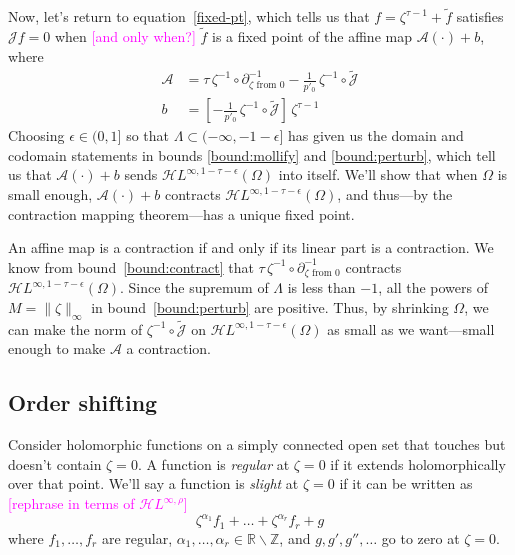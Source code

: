 \documentclass{article}
\theoremstyle{plain}
\newcommand{\Z}{\mathbb{Z}}
\newcommand{\R}{\mathbb{R}}
\newcommand{\holoL}[1]{\mathcal{H}L^{#1}} %
\begin{document}
Now, let's return to equation~\ref{fixed-pt}, which tells us that $f = \zeta^{\tau-1} + \tilde{f}$ satisfies $\mathcal{J}f = 0$ when \textcolor{magenta}{[and only when?]} $\tilde{f}$ is a fixed point of the affine map $\mathcal{A}(\cdot) + b$, where
\begin{align*}
\mathcal{A} & = \tau\,\zeta^{-1} \circ \partial^{-1}_{\zeta \text{ from } 0} - \tfrac{1}{p'_0}\,\zeta^{-1} \circ \tilde{\mathcal{J}} \\
b & = \left[ -\tfrac{1}{p'_0}\,\zeta^{-1} \circ \tilde{\mathcal{J}} \right]\,\zeta^{\tau-1}
\end{align*}
Choosing $\epsilon \in (0, 1]$ so that $\Lambda \subset (-\infty, -1 - \epsilon]$ has given us the domain and codomain statements in bounds \ref{bound:mollify} and \ref{bound:perturb}, which tell us that $\mathcal{A}(\cdot) + b$ sends $\holoL{\infty, 1-\tau-\epsilon}(\Omega)$ into itself. We'll show that when $\Omega$ is small enough, $\mathcal{A}(\cdot) + b$ contracts $\holoL{\infty, 1-\tau-\epsilon}(\Omega)$, and thus---by the contraction mapping theorem---has a unique fixed point.

An affine map is a contraction if and only if its linear part is a contraction. We know from bound~\ref{bound:contract} that $\tau\,\zeta^{-1} \circ \partial^{-1}_{\zeta \text{ from } 0}$ contracts $\holoL{\infty, 1-\tau-\epsilon}(\Omega)$. Since the supremum of $\Lambda$ is less than $-1$, all the powers of $M = \|\zeta\|_\infty$ in bound~\ref{bound:perturb} are positive. Thus, by shrinking $\Omega$, we can make the norm of $\zeta^{-1} \circ \tilde{\mathcal{J}}$ on $\holoL{\infty, 1-\tau-\epsilon}(\Omega)$ as small as we want---small enough to make $\mathcal{A}$ a contraction.
\subsection{Order shifting}\label{shifting}
Consider holomorphic functions on a simply connected open set that touches but doesn't contain $\zeta = 0$. A function is {\em regular} at $\zeta = 0$ if it extends holomorphically over that point. We'll say a function is {\em slight} at $\zeta = 0$ if it can be written as \textcolor{magenta}{[rephrase in terms of $\holoL{\infty, \rho}$]}
\begin{equation}\label{eqn:slight-defn}
\zeta^{\alpha_1} f_1 + \ldots + \zeta^{\alpha_r} f_r + g
\end{equation}
where $f_1, \ldots, f_r$ are regular, $\alpha_1, \ldots, \alpha_r \in \R \smallsetminus \Z$, and $g, g', g'', \ldots$ go to zero at $\zeta = 0$.
\end{document}
